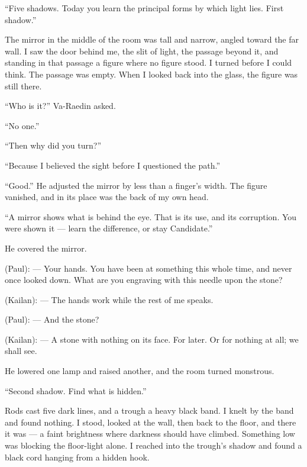 ``Five shadows. Today you learn the principal forms by which light lies. First shadow.''\par

The mirror in the middle of the room was tall and narrow, angled toward the far wall. I saw the door behind me, the slit of light, the passage beyond it, and standing in that passage a figure where no figure stood. I turned before I could think. The passage was empty. When I looked back into the glass, the figure was still there.\par

``Who is it?'' Va-Raedin asked.\par
``No one.''\par
``Then why did you turn?''\par
``Because I believed the sight before I questioned the path.''\par

``Good.'' He adjusted the mirror by less than a finger's width. The figure vanished, and in its place was the back of my own head.\par

``A mirror shows what is behind the eye. That is its use, and its corruption. You were shown it — learn the difference, or stay Candidate.''\par

He covered the mirror.\par

\begin{room}

(Paul): --- Your hands. You have been at something this whole time, and never once looked down. What are you engraving with this needle upon the stone?

(Kailan): --- The hands work while the rest of me speaks.

(Paul): --- And the stone?

(Kailan): --- A stone with nothing on its face. For later. Or for nothing at all; we shall see.

\end{room}

He lowered one lamp and raised another, and the room turned monstrous. 

``Second shadow. Find what is hidden.''\par

Rods cast five dark lines, and a trough a heavy black band. I knelt by the band and found nothing. I stood, looked at the wall, then back to the floor, and there it was --- a faint brightness where darkness should have climbed. Something low was blocking the floor-light alone. I reached into the trough's shadow and found a black cord hanging from a hidden hook.\par

